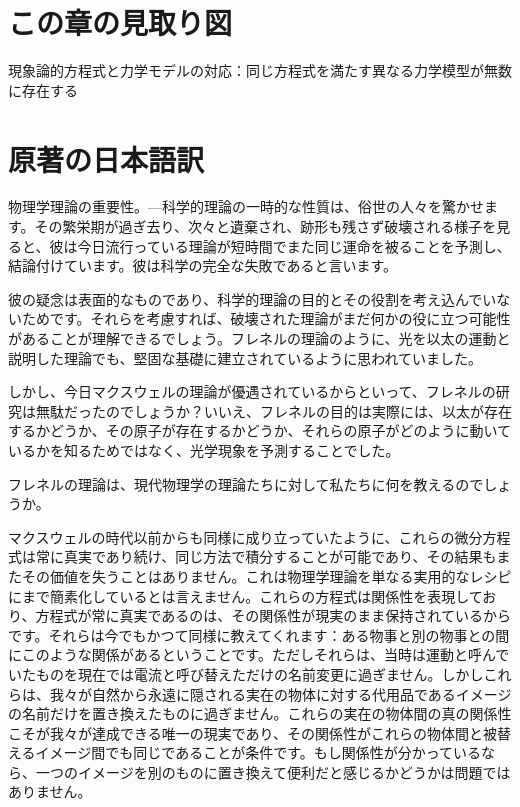 \documentclass[a4paper,11pt,openany]{ltjsbook}
\begin{document}
\section*{この章の見取り図}
\begin{center}


\small 現象論的方程式と力学モデルの対応：同じ方程式を満たす異なる力学模型が無数に存在する
\end{center}

\section{原著の日本語訳}
物理学理論の重要性。—科学的理論の一時的な性質は、俗世の人々を驚かせます。その繁栄期が過ぎ去り、次々と遺棄され、跡形も残さず破壊される様子を見ると、彼は今日流行っている理論が短時間でまた同じ運命を被ることを予測し、結論付けています。彼は科学の完全な失敗であると言います。

彼の疑念は表面的なものであり、科学的理論の目的とその役割を考え込んでいないためです。それらを考慮すれば、破壊された理論がまだ何かの役に立つ可能性があることが理解できるでしょう。フレネルの理論のように、光を以太の運動と説明した理論でも、堅固な基礎に建立されているように思われていました。

しかし、今日マクスウェルの理論が優遇されているからといって、フレネルの研究は無駄だったのでしょうか？いいえ、フレネルの目的は実際には、以太が存在するかどうか、その原子が存在するかどうか、それらの原子がどのように動いているかを知るためではなく、光学現象を予測することでした。

フレネルの理論は、現代物理学の理論たちに対して私たちに何を教えるのでしょうか。

マクスウェルの時代以前からも同様に成り立っていたように、これらの微分方程式は常に真実であり続け、同じ方法で積分することが可能であり、その結果もまたその価値を失うことはありません。これは物理学理論を単なる実用的なレシピにまで簡素化しているとは言えません。これらの方程式は関係性を表現しており、方程式が常に真実であるのは、その関係性が現実のまま保持されているからです。それらは今でもかつて同様に教えてくれます：ある物事と別の物事との間にこのような関係があるということです。ただしそれらは、当時は運動と呼んでいたものを現在では電流と呼び替えただけの名前変更に過ぎません。しかしこれらは、我々が自然から永遠に隠される実在の物体に対する代用品であるイメージの名前だけを置き換えたものに過ぎません。これらの実在の物体間の真の関係性こそが我々が達成できる唯一の現実であり、その関係性がこれらの物体間と被替えるイメージ間でも同じであることが条件です。もし関係性が分かっているなら、一つのイメージを別のものに置き換えて便利だと感じるかどうかは問題ではありません。
\end{document}
